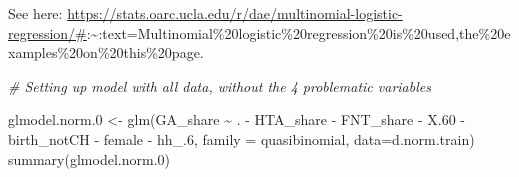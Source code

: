 \documentclass[
]{article}
\newenvironment{Shaded}{\begin{snugshade}}{\end{snugshade}}
\newcommand{\AttributeTok}[1]{\textcolor[rgb]{0.77,0.63,0.00}{#1}}
\newcommand{\CommentTok}[1]{\textcolor[rgb]{0.56,0.35,0.01}{\textit{#1}}}
\newcommand{\FloatTok}[1]{\textcolor[rgb]{0.00,0.00,0.81}{#1}}
\newcommand{\FunctionTok}[1]{\textcolor[rgb]{0.00,0.00,0.00}{#1}}
\newcommand{\NormalTok}[1]{#1}
\newcommand{\OtherTok}[1]{\textcolor[rgb]{0.56,0.35,0.01}{#1}}
\newcommand{\SpecialCharTok}[1]{\textcolor[rgb]{0.00,0.00,0.00}{#1}}
\begin{document}
See here:
\url{https://stats.oarc.ucla.edu/r/dae/multinomial-logistic-regression/\#}:\textasciitilde:text=Multinomial\%20logistic\%20regression\%20is\%20used,the\%20examples\%20on\%20this\%20page.

\begin{Shaded}
\begin{Highlighting}[]
\CommentTok{\# Setting up model with all data, without the 4 problematic variables}

\NormalTok{glmodel.norm}\FloatTok{.0} \OtherTok{\textless{}{-}} \FunctionTok{glm}\NormalTok{(GA\_share }\SpecialCharTok{\textasciitilde{}}\NormalTok{ . }\SpecialCharTok{{-}}\NormalTok{ HTA\_share }\SpecialCharTok{{-}}\NormalTok{ FNT\_share }\SpecialCharTok{{-}} 
\NormalTok{                   X}\FloatTok{.60} \SpecialCharTok{{-}}\NormalTok{ birth\_notCH }\SpecialCharTok{{-}}\NormalTok{ female }\SpecialCharTok{{-}}\NormalTok{ hh\_}\FloatTok{.6}\NormalTok{, }
                \AttributeTok{family =}\NormalTok{ quasibinomial, }\AttributeTok{data=}\NormalTok{d.norm.train)}
\FunctionTok{summary}\NormalTok{(glmodel.norm}\FloatTok{.0}\NormalTok{)}
\end{Highlighting}
\end{Shaded}
\end{document}
